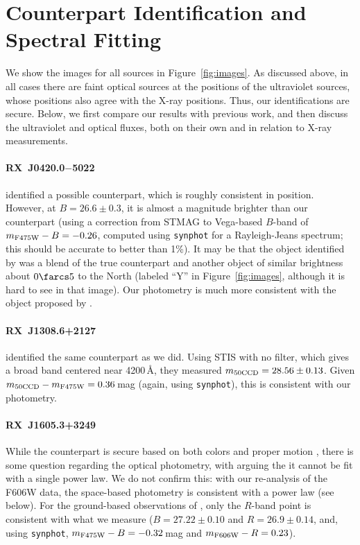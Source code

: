 \documentclass[iop]{emulateapj}
\newcommand{\rbs}{RX~J1308.6+2127}
\newcommand{\rxjvk}{RX~J1605.3+3249}
\newcommand{\rxjb}{RX~J0420.0$-$5022}
\begin{document}
\section{Counterpart Identification and Spectral Fitting}
\label{sec:cpt}
We show the images for all sources in Figure~\ref{fig:images}.  As
discussed above, in all cases there are faint optical sources at the
positions of the ultraviolet sources, whose positions also agree with
the X-ray positions.  Thus, our identifications are secure.  Below, we
first compare our results with previous work, and then discuss the
ultraviolet and optical fluxes, both on their own and in relation to
X-ray measurements.


\paragraph{\rxjb} \citet{hmz+04} identified a possible counterpart,
which is roughly consistent in position.  However, at $B=26.6\pm0.3$,
it is almost a magnitude brighter than our counterpart (using a
correction from STMAG to Vega-based $B$-band of $m_{\rm
  F475W}-B=-0.26$, computed using \texttt{synphot} for a
Rayleigh-Jeans spectrum; this should be accurate to better than 1\%).
It may be that the object identified by \citet{hmz+04} was a blend of
the true counterpart and another object of similar brightness about
$0\farcs5$ to the North (labeled ``Y'' in Figure~\ref{fig:images},
although it is hard to see in that image).  Our photometry is much
more consistent with the object proposed by \citet{mmh+09}.

\paragraph{\rbs} \citet*{kkvk02} identified the same counterpart as we
did.  Using STIS with no filter, which gives a broad band centered
near 4200\,\AA, they measured $m_{\rm 50CCD}=28.56\pm0.13$.  Given
$m_{\rm 50CCD}-m_{\rm F475W}=0.36\,$mag (again, using
\texttt{synphot}), this is consistent with our photometry.


\paragraph{\rxjvk} While the counterpart is secure based on both
colors and proper motion \citep{kkvk03,msh+05,zdlmt06}, there is some
question regarding the optical photometry, with \citet{zdlmt06}
arguing the it cannot be fit with a single power law.  We do not
confirm this: with our re-analysis of the F606W data, the space-based
photometry is consistent with a power law (see below).  For the
ground-based observations of \citet{msh+05}, only the $R$-band point
is consistent with what we measure ($B=27.22\pm0.10$ and
$R=26.9\pm0.14$, and, using {\tt synphot}, $m_{\rm F475W}-B=
-0.32$\,mag and $m_{\rm F606W}-R=0.23$).
\end{document}
